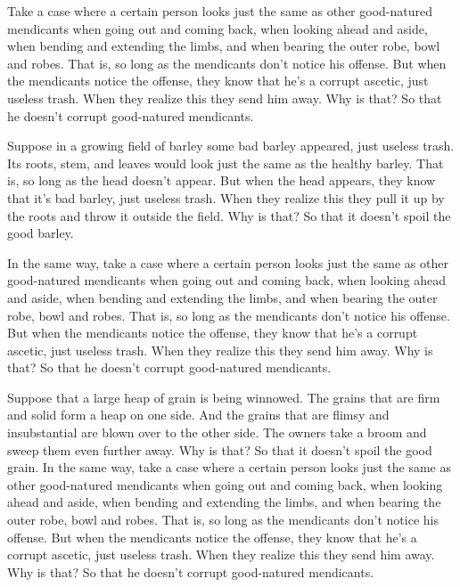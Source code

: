 \documentclass[12pt,openany]{book}%
\begin{document}
Take a case where a certain person looks just the same as other good-natured mendicants when going out and coming back, when looking ahead and aside, when bending and extending the limbs, and when bearing the outer robe, bowl and robes. That is, so long as the mendicants don’t notice his offense. But when the mendicants notice the offense, they know that he’s a corrupt ascetic, just useless trash. When they realize this they send him away. Why is that? So that he doesn’t corrupt good-natured mendicants. 

Suppose in a growing field of barley some bad barley appeared, just useless trash. Its roots, stem, and leaves would look just the same as the healthy barley. That is, so long as the head doesn’t appear. But when the head appears, they know that it’s bad barley, just useless trash. When they realize this they pull it up by the roots and throw it outside the field. Why is that? So that it doesn’t spoil the good barley. 

In the same way, take a case where a certain person looks just the same as other good-natured mendicants when going out and coming back, when looking ahead and aside, when bending and extending the limbs, and when bearing the outer robe, bowl and robes. That is, so long as the mendicants don’t notice his offense. But when the mendicants notice the offense, they know that he’s a corrupt ascetic, just useless trash. When they realize this they send him away. Why is that? So that he doesn’t corrupt good-natured mendicants. 

Suppose that a large heap of grain is being winnowed. The grains that are firm and solid form a heap on one side. And the grains that are flimsy and insubstantial are blown over to the other side. The owners take a broom and sweep them even further away. Why is that? So that it doesn’t spoil the good grain. In the same way, take a case where a certain person looks just the same as other good-natured mendicants when going out and coming back, when looking ahead and aside, when bending and extending the limbs, and when bearing the outer robe, bowl and robes. That is, so long as the mendicants don’t notice his offense. But when the mendicants notice the offense, they know that he’s a corrupt ascetic, just useless trash. When they realize this they send him away. Why is that? So that he doesn’t corrupt good-natured mendicants. 
\end{document}
